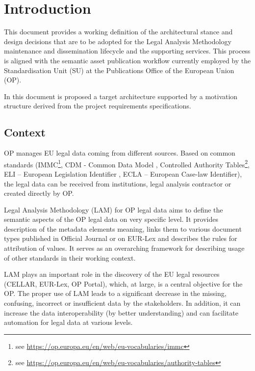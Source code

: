 \chapter{Introduction}
\label{sec:introduction}
	
	This document provides a working definition of the architectural stance and design decisions that are to be adopted for the Legal Analysis Methodology maintenance and dissemination lifecycle and the supporting services. This process is aligned with the semantic asset publication workflow currently employed by the Standardisation Unit (SU) at the Publications Office of the European Union (OP).
	
	In this document is proposed a target architecture supported by a motivation structure derived from the project requirements specifications.
	
	\section{Context}
	\label{sec:context}
	
	OP manages EU legal data coming from different sources. Based on common standards (IMMC\footnote{see \url{https://op.europa.eu/en/web/eu-vocabularies/immc}}, CDM - Common Data Model \citep{cdm-francesconi2015ontology,cdm-francesconi2015semantic}, Controlled Authority Tables\footnote{see \url{https://op.europa.eu/en/web/eu-vocabularies/authority-tables}}, ELI – European Legislation Identifier \citep{eli-conclussions-2012/c325/02,eli-conclussions-2017/c441/05}, ECLA – European Case-law Identifier\citep{ecli-van2011european,ecli-van2017line}), the legal data can be received from institutions, legal analysis contractor or created directly by OP.
	
	Legal Analysis Methodology (LAM) for OP legal data aims to define the semantic aspects of the OP legal data on very specific level. It provides description of the metadata elements meaning, links them to various document types published in Official Journal or on EUR-Lex and describes the rules for attribution of values. It serves as an overarching framework for describing usage of other standards in their working context.
	
	LAM plays an important role in the discovery of the EU legal resources (CELLAR, EUR-Lex, OP Portal), which,  at large, is a central objective for the OP. The proper use of LAM leads to a significant decrease in the missing, confusing, incorrect or insufficient data by the stakeholders. In addition, it can increase the data interoperability (by better understanding) and can facilitate automation for legal data at various levels.
	
